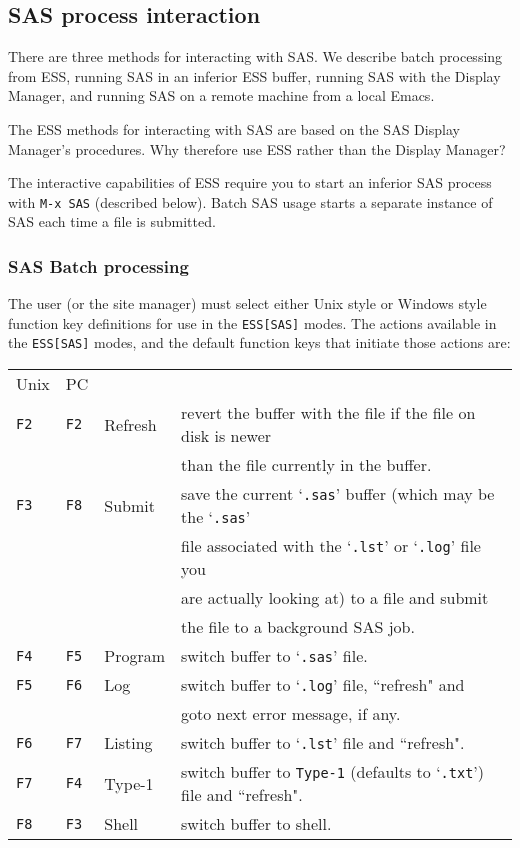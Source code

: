 \documentclass{article}
\newcommand{\stexttt}[1]{{\small\texttt{#1}}}
\newcommand{\file}[1]{`\stexttt{#1}'}
\begin{document}
\subsection{SAS process interaction}
\label{sec:SAS:proc}

There are three methods for interacting with SAS.  We describe batch
processing from ESS, running SAS in an inferior ESS buffer, running
SAS with the Display Manager, and running SAS on a remote machine from
a local Emacs.

The ESS methods for interacting with SAS are based on the SAS Display
Manager's procedures.  Why therefore use ESS rather than the
Display Manager?  

The interactive capabilities of ESS require you to start an inferior
SAS process with \stexttt{M-x SAS} (described below).  Batch SAS usage
starts a separate instance of SAS each time a file is submitted.

\subsubsection{SAS Batch processing}
\label{sec:SAS:proc:batch}

The user (or the site manager) must select either Unix style or
Windows style function key definitions for use in the
\stexttt{ESS[SAS]} modes.  The actions available in the
\stexttt{ESS[SAS]} modes, and the default function keys that initiate
those actions are:\\
\begin{tabular}{llll}
Unix& PC&\\
\stexttt{F2} &\stexttt{F2}& Refresh &revert the buffer with the file if the file on disk is newer\\
\stexttt{}   &\stexttt{}  &         &       than the file currently in the buffer.\\
\stexttt{F3} &\stexttt{F8}& Submit  &save   the current \file{.sas} buffer (which may be the \file{.sas}\\
\stexttt{}   &\stexttt{}  &         &       file associated with the \file{.lst} or \file{.log} file you\\
\stexttt{}   &\stexttt{}  &         &       are actually looking at) to a file and submit\\
\stexttt{}   &\stexttt{}  &         &       the file to a background SAS job.\\
\stexttt{F4} &\stexttt{F5}& Program &switch buffer to \file{.sas} file.\\
\stexttt{F5} &\stexttt{F6}& Log     &switch buffer to \file{.log} file, ``refresh" and \\
\stexttt{}   &\stexttt{}  &         &        goto next error message, if any.\\
\stexttt{F6} &\stexttt{F7}& Listing &switch buffer to \file{.lst} file and ``refresh".\\
\stexttt{F7} &\stexttt{F4}& Type-1  &switch buffer to \stexttt{Type-1} (defaults to \file{.txt}) file and ``refresh".\\
\stexttt{F8} &\stexttt{F3}& Shell   &switch buffer to shell.\\
\end{tabular}
\end{document}
